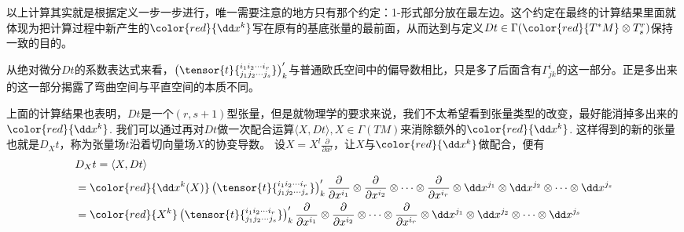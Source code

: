 以上计算其实就是根据定义一步一步进行，唯一需要注意的地方只有那个约定：1-形式部分放在最左边。这个约定在最终的计算结果里面就体现为把计算过程中新产生的${\color{red}{\dd x^{k}}}$写在原有的基底张量的最前面，从而达到与定义$Dt\in \Gamma({\color{red}{T^{\ast}M}}\otimes T^{r}_{s})$保持一致的目的。

从绝对微分$Dt$的系数表达式来看，$\left(\tensor{t}{^{i_{1}i_{2}\cdots i_{r}}_{j_{1}j_{2}\cdots j_{s}}}\right)^{\prime}_{ k}$与普通欧氏空间中的偏导数相比，只是多了后面含有$\Gamma_{jk}^{i}$的这一部分。正是多出来的这一部分揭露了弯曲空间与平直空间的本质不同。

上面的计算结果也表明，$Dt$是一个$(r,s+1)$型张量，但是就物理学的要求来说，我们不太希望看到张量类型的改变，最好能消掉多出来的${\color{red}{\dd x^{k}}}$. 我们可以通过再对$Dt$做一次配合运算$\langle X,Dt\rangle ,X\in \Gamma(TM)$来消除额外的${\color{red}{\dd x^{k}}}$. 这样得到的新的张量也就是$D_{X}t$，称为张量场$t$沿着切向量场$X$的协变导数。
设$X=X^{l}\frac { \partial } { \partial x ^ { l } }$，让$X$与${\color{red}{\dd x^{k}}}$做配合，便有
\[
	\begin{split}
	&D_{X}t=\langle X,Dt\rangle\\
	&={\color{red}{\dd x^{k}(X)}}\left(\tensor{t}{^{i_{1}i_{2}\cdots i_{r}}_{j_{1}j_{2}\cdots j_{s}}}\right)^{\prime}_{ k}\frac { \partial } { \partial x ^ { i_{1} } }\otimes\frac { \partial } { \partial x ^ { i_{2} } }\otimes\cdots\otimes\frac { \partial } { \partial x ^ { i_{r} } }\otimes   \dd x^{j_{1}}\otimes\dd x^{j_{2}}\otimes\cdots\otimes\dd x^{j_{s}} \\
	&={\color{red}{X^{k}}}\left(\tensor{t}{^{i_{1}i_{2}\cdots i_{r}}_{j_{1}j_{2}\cdots j_{s}}}\right)^{\prime}_{ k}\frac { \partial } { \partial x ^ { i_{1} } }\otimes\frac { \partial } { \partial x ^ { i_{2} } }\otimes\cdots\otimes\frac { \partial } { \partial x ^ { i_{r} } }\otimes   \dd x^{j_{1}}\otimes\dd x^{j_{2}}\otimes\cdots\otimes\dd x^{j_{s}} \\
	\end{split}
\]

